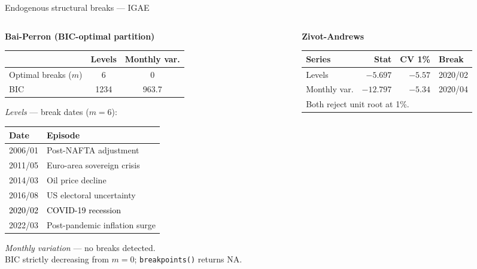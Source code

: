\documentclass[handout,aspectratio=169,11pt,xcolor={dvipsnames},hyperref={pdftex,pdfpagemode=UseNone,hidelinks,pdfdisplaydoctitle=true},usepdftitle=false]{beamer}
\begin{document}
\begin{frame}{Endogenous structural breaks — IGAE}

\begin{columns}[T]

\begin{column}{0.52\textwidth}
\small\textbf{Bai-Perron (BIC-optimal partition)}

\vspace{2mm}
\small
\begin{tabular}{lcc}
\hline
 & \textbf{Levels} & \textbf{Monthly var.} \\
\hline
Optimal breaks ($m$) & 6 & 0 \\
BIC & 1234 & 963.7 \\
\hline
\end{tabular}

\vspace{3mm}
\textit{Levels} — break dates ($m = 6$):

\vspace{1mm}
\begin{tabular}{ll}
\hline
\textbf{Date} & \textbf{Episode} \\
\hline
2006/01 & Post-NAFTA adjustment \\
2011/05 & Euro-area sovereign crisis \\
2014/03 & Oil price decline \\
2016/08 & US electoral uncertainty \\
\textcolor{black}{2020/02} & \textcolor{black}{COVID-19 recession} \\
2022/03 & Post-pandemic inflation surge \\
\hline
\end{tabular}

\vspace{3mm}
\textit{Monthly variation} — no breaks detected. \\
{\tiny BIC strictly decreasing from $m=0$; \texttt{breakpoints()} returns NA.}

\end{column}

\begin{column}{0.45\textwidth}
\small\textbf{Zivot-Andrews }

\vspace{2mm}
\small
\begin{tabular}{lrrl}
\hline
\textbf{Series} & \textbf{Stat} & \textbf{CV 1\%} & \textbf{Break} \\
\hline
Levels       & $-5.697$ & $-5.57$ & 2020/02 \\
Monthly var. & $-12.797$ & $-5.34$ & 2020/04 \\
\hline
\multicolumn{4}{l}{Both reject unit root at 1\%.} \\
\end{tabular}



\end{column}
\end{columns}
\end{frame}
\end{document}
